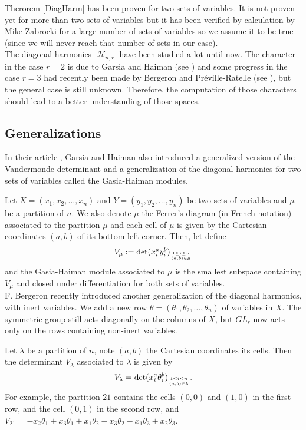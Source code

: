 \documentclass[letter,12pt]{article}
\DeclareMathOperator{\harmonics}{\mathcal{H}}
\begin{document}
	Therorem \ref{DiagHarm} has been proven for two sets of variables. It is not proven yet for more than two sets of variables but it has been verified by calculation by Mike Zabrocki for a large number of sets of variables so we assume it to be true (since we will never reach that number of sets in our case).  \\
	
	The diagonal harmonics $\harmonics_{n,r}$ have been studied a lot until now. The character in the case $r=2$ is due to Garsia and Haiman (see \cite{GarsiaHaiman1993}) and some progress in the case $r=3$ had recently been made by Bergeron and Préville-Ratelle (see \cite{BergeronPreville2012}), but the general case is still unknown. Therefore, the computation of those characters should lead to a better understanding of those spaces. 
	
	\subsection{Generalizations}
	
	In their article \cite{GarsiaHaiman1993}, Garsia and Haiman also introduced a generalized version of the Vandermonde determinant and a generalization of the diagonal harmonics for two sets of variables called the Gasia-Haiman modules. 
	
	Let $X=(x_1, x_2, \dots, x_n)$ and $Y=(y_1, y_2, \dots, y_n)$ be two sets of variables and $\mu$ be a partition of $n$. We also denote $\mu$ the Ferrer's diagram (in French notation) associated to the partition $\mu$ and each cell of $\mu$ is given by the Cartesian coordinates $(a,b)$ of its bottom left corner. Then, let define
	$$V_{\mu} := \det (x_i^ ay_i^ b)_{1 \leq i \leq n \atop (a,b) \in \mu}$$
	and the Gasia-Haiman module associated to $\mu$ is the smallest subspace containing $V_{\mu}$ and closed under differentiation for both sets of variables. \\
	
	F. Bergeron recently introduced another generalization of the diagonal harmonics, with inert variables. We add a new row $\theta = (\theta_1, \theta_2, \dots, \theta_n)$ of variables in $X$. The symmetric group still acts diagonally on the columns of $X$, but $GL_r$ now acts only on the rows containing non-inert variables. 
		 
	Let $\lambda$ be a partition of $n$, note $(a,b)$ the Cartesian coordinates its cells. Then the determinant $V_{\lambda}$ associated to $\lambda$ is given by $$V_{\lambda} = \det (x_i^a \theta_i^b)_{1 \leq i \leq n \atop (a,b) \in \lambda} .$$
	For example, the partition $21$ contains the cells $(0,0)$ and $(1,0)$ in the first row, and the cell $(0,1)$ in the second row, and $V_{21} = -x_2\theta_1 + x_3\theta_1 + x_1\theta_2 - x_3\theta_2 - x_1\theta_3 + x_2\theta_3$. 
	
\end{document}
